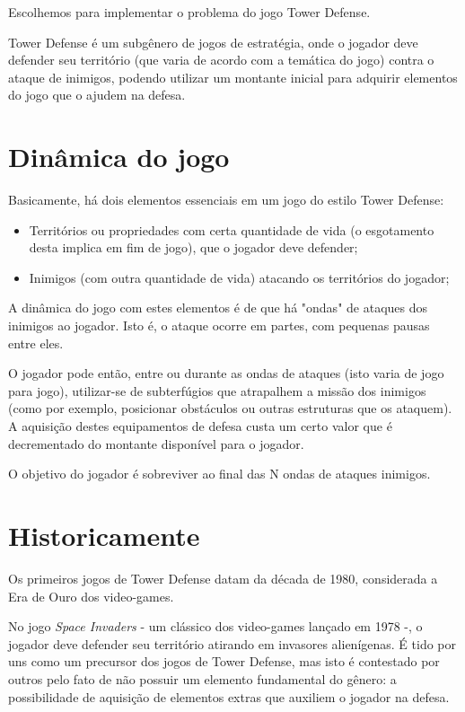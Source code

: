 \documentclass[rel_mlp]{iiufrgs}
\begin{document}
Escolhemos para implementar o problema do jogo Tower Defense.

Tower Defense é um subgênero de jogos de estratégia, onde o jogador deve defender seu território (que varia de acordo com a temática do jogo) contra o ataque de inimigos, podendo utilizar um montante inicial para adquirir elementos do jogo que o ajudem na defesa.



\section{Dinâmica do jogo}

Basicamente, há dois elementos essenciais em um jogo do estilo Tower Defense:

\begin{itemize}[leftmargin=3em]
\setlength{\itemindent}{1em}

    \item Territórios ou propriedades com certa quantidade de vida (o esgotamento desta implica em fim de jogo), que o jogador deve defender;

    \item Inimigos (com outra quantidade de vida) atacando os territórios do jogador;

\end{itemize}

A dinâmica do jogo com estes elementos é de que há "ondas" de ataques dos inimigos ao jogador. Isto é, o ataque ocorre em partes, com pequenas pausas entre eles.

O jogador pode então, entre ou durante as ondas de ataques (isto varia de jogo para jogo), utilizar-se de subterfúgios que atrapalhem a missão dos inimigos (como por exemplo, posicionar obstáculos ou outras estruturas que os ataquem). A aquisição destes equipamentos de defesa custa um certo valor que é decrementado do montante disponível para o jogador.

O objetivo do jogador é sobreviver ao final das N ondas de ataques inimigos.


\section{Historicamente}

Os primeiros jogos de Tower Defense datam da década de 1980, considerada a Era de Ouro dos video-games.

No jogo \textit{Space Invaders} - um clássico dos video-games lançado em 1978 -, o jogador deve defender seu território atirando em invasores alienígenas. É tido por uns como um precursor dos jogos de Tower Defense, mas isto é contestado por outros pelo fato de não possuir um elemento fundamental do gênero: a possibilidade de aquisição de elementos extras que auxiliem o jogador na defesa.
\end{document}
